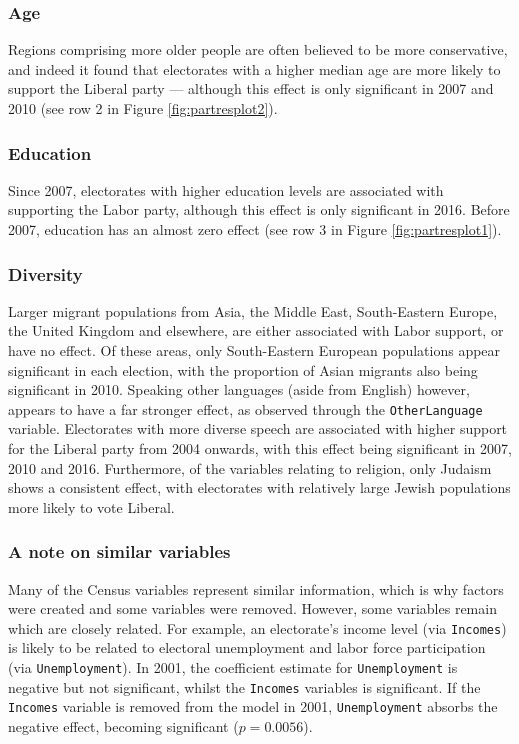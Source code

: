 \documentclass[11pt,a4paper,]{article}
\begin{document}
\subsubsection{Age}\label{age}

Regions comprising more older people are often believed to be more
conservative, and indeed it found that electorates with a higher median
age are more likely to support the Liberal party --- although this
effect is only significant in 2007 and 2010 (see row 2 in Figure
\ref{fig:partresplot2}).

\subsubsection{Education}\label{education}

Since 2007, electorates with higher education levels are associated with
supporting the Labor party, although this effect is only significant in
2016. Before 2007, education has an almost zero effect (see row 3 in
Figure \ref{fig:partresplot1}).

\subsubsection{Diversity}\label{diversity}

Larger migrant populations from Asia, the Middle East, South-Eastern
Europe, the United Kingdom and elsewhere, are either associated with
Labor support, or have no effect. Of these areas, only South-Eastern
European populations appear significant in each election, with the
proportion of Asian migrants also being significant in 2010. Speaking
other languages (aside from English) however, appears to have a far
stronger effect, as observed through the \texttt{OtherLanguage}
variable. Electorates with more diverse speech are associated with
higher support for the Liberal party from 2004 onwards, with this effect
being significant in 2007, 2010 and 2016. Furthermore, of the variables
relating to religion, only Judaism shows a consistent effect, with
electorates with relatively large Jewish populations more likely to vote
Liberal.

\subsubsection{A note on similar
variables}\label{a-note-on-similar-variables}

Many of the Census variables represent similar information, which is why
factors were created and some variables were removed. However, some
variables remain which are closely related. For example, an electorate's
income level (via \texttt{Incomes}) is likely to be related to electoral
unemployment and labor force participation (via \texttt{Unemployment}).
In 2001, the coefficient estimate for \texttt{Unemployment} is negative
but not significant, whilst the \texttt{Incomes} variables is
significant. If the \texttt{Incomes} variable is removed from the model
in 2001, \texttt{Unemployment} absorbs the negative effect, becoming
significant (\(p = 0.0056\)).
\end{document}
